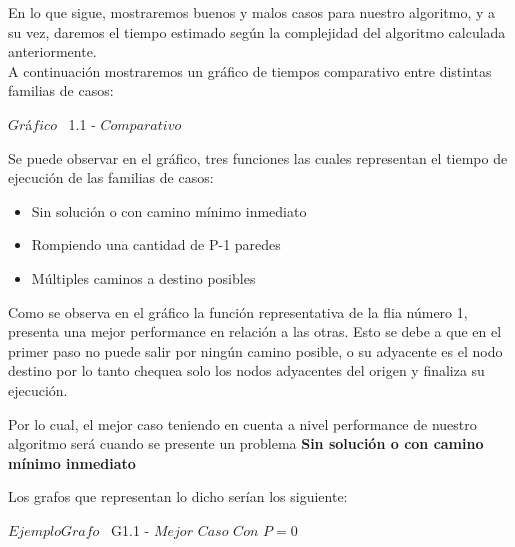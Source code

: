 \indent En lo que sigue, mostraremos buenos y malos casos para nuestro algoritmo, y a su vez, daremos el tiempo estimado 
seg\'un la complejidad del algoritmo calculada anteriormente.\\


A continuaci\'on mostraremos un gr\'afico de tiempos comparativo entre distintas familias de casos:\\ 

\vspace*{0.3cm} \vspace*{0.3cm}
  \begin{center}
 {            $Gr$\'a$fico$ \ 1.1 - $Comparativo$}
  \end{center}
  \vspace*{0.3cm}
  
Se puede observar en el gr\'afico, tres funciones las cuales representan el tiempo de ejecuci\'on de las familias de casos:\\
\begin{itemize}
\item Sin soluci\'on o con camino m\'inimo inmediato
\item Rompiendo una cantidad de P-1 paredes
\item M\'ultiples caminos a destino posibles
\end{itemize}


Como se observa en el gr\'afico la funci\'on representativa de la flia n\'umero 1, presenta una mejor performance en relaci\'on a las otras. Esto se debe a que en el primer paso no puede salir por ning\'un camino posible, o su adyacente es el nodo destino por lo tanto chequea solo los nodos adyacentes del origen y finaliza su ejecuci\'on.

Por lo cual, el mejor caso teniendo en cuenta a nivel performance de nuestro algoritmo ser\'a cuando se presente un problema \textbf{Sin soluci\'on o con camino m\'inimo inmediato}

Los grafos que representan lo dicho ser\'ian los siguiente:\\

\vspace*{0.3cm} \vspace*{0.3cm}
  \begin{center}
{$Ejemplo Grafo$ \ G1.1 - $Mejor$ $Caso$ $Con$ $P=0$ }
  \end{center}
  \vspace*{0.3cm}

